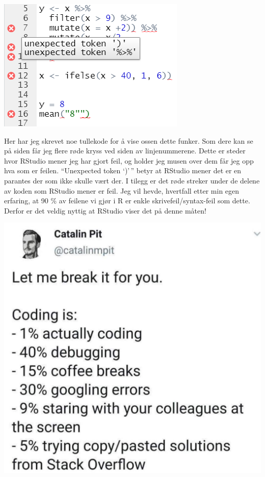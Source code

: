 \documentclass[
]{article}
\begin{document}
\includegraphics{Bilder/TulleFeil.png}

Her har jeg skrevet noe tullekode for å vise ossen dette funker. Som
dere kan se på siden får jeg flere røde kryss ved siden av
linjenummerene. Dette er steder hvor RStudio mener jeg har gjort feil,
og holder jeg musen over dem får jeg opp hva som er feilen. ``Unexpected
token `)'\,'' betyr at RStudio mener det er en parantes der som ikke
skulle vært der. I tilegg er det røde streker under de delene av koden
som RStudio mener er feil. Jeg vil hevde, hvertfall etter min egen
erfaring, at 90 \% av feilene vi gjør i R er enkle
skrivefeil/syntax-feil som dette. Derfor er det veldig nyttig at RStudio
viser det på denne måten!

\includegraphics{Bilder/Coding.jpg}
\end{document}
